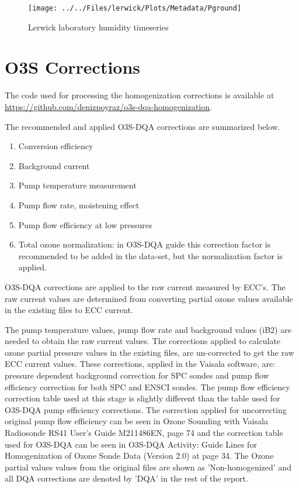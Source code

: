 \documentclass{article}
\begin{document}
\begin{figure}
\centering
\texttt{[image: ../../Files/lerwick/Plots/Metadata/Pground]}
\caption{Lerwick laboratory humidity timeseries}
\label{fig:PLab}
\end{figure}

\section{O3S Corrections}
The code used for processing the homogenization corrections is available at \url{https://github.com/denizpoyraz/o3s-dqa-homogenization}.
\label{sec:v04}


The recommended and applied O3S-DQA corrections are summarized below.
\begin{enumerate}
\item Conversion efficiency
\item Background current
\item Pump temperature measurement
\item Pump flow rate, moistening effect
\item Pump flow efficiency at low pressures
\item Total ozone normalization: in O3S-DQA guide this correction factor is recommended to be added in the data-set,
but the normalization factor is applied.
\end{enumerate}


O3S-DQA corrections are applied to the raw current measured by ECC's. The raw current values are
determined from converting partial ozone values available
in the existing files to ECC current.

The pump temperature values, pump flow rate and background values (iB2) are needed
to obtain the raw current values.
The corrections applied to calculate ozone partial pressure values in the existing files, are un-corrected to
get the raw ECC current values. These corrections, applied in the Vaisala software, are:
pressure dependent background correction for SPC sondes and pump flow
efficiency correction for both SPC and ENSCI sondes. The pump flow efficiency correction table used at this stage is slightly different than
the table used for O3S-DQA pump efficiency corrections.
The correction applied for uncorrecting original pump flow efficiency can be seen in Ozone Sounding with Vaisala
Radiosonde RS41 User's Guide M211486EN, page 74 and the correction table
used for O3S-DQA can be seen in O3S-DQA Activity: Guide Lines for Homogenization of Ozone Sonde Data (Version 2.0)
at page 34.
The Ozone partial values values from the original files are shown as
'Non-homogenized' and all DQA corrections are denoted by 'DQA'
in the rest of the report.
\end{document}
